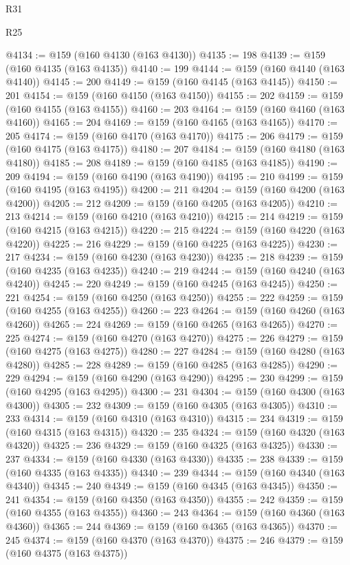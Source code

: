\begin{lexlean}{R31}
\begin{lexlean}{R25}
\begin{coremodule}
{{{{{{{{{{{{{{{{{{{{{{{{{{{{{{{{{{{{{{{{{{{{{{{{{{{{{{{{{{{{{{{{{{{{{{{{{{{{{{{{{{{{{{{{{{{{{{{{{{{{{{{{{{{{{{{{{{{{{{{{{{{{{{{{{{{{{{{{{{{{{{{{{{{{{{{{{{{{{{{{{{{{{{{{{{{{{{{{{{{{{{{{{{{{{{{{{{{{{{{@4134 := @159 (@160 @4130 (@163 @4130))
@4135 := 198
@4139 := @159 (@160 @4135 (@163 @4135))
@4140 := 199
@4144 := @159 (@160 @4140 (@163 @4140))
@4145 := 200
@4149 := @159 (@160 @4145 (@163 @4145))
@4150 := 201
@4154 := @159 (@160 @4150 (@163 @4150))
@4155 := 202
@4159 := @159 (@160 @4155 (@163 @4155))
@4160 := 203
@4164 := @159 (@160 @4160 (@163 @4160))
@4165 := 204
@4169 := @159 (@160 @4165 (@163 @4165))
@4170 := 205
@4174 := @159 (@160 @4170 (@163 @4170))
@4175 := 206
@4179 := @159 (@160 @4175 (@163 @4175))
@4180 := 207
@4184 := @159 (@160 @4180 (@163 @4180))
@4185 := 208
@4189 := @159 (@160 @4185 (@163 @4185))
@4190 := 209
@4194 := @159 (@160 @4190 (@163 @4190))
@4195 := 210
@4199 := @159 (@160 @4195 (@163 @4195))
@4200 := 211
@4204 := @159 (@160 @4200 (@163 @4200))
@4205 := 212
@4209 := @159 (@160 @4205 (@163 @4205))
@4210 := 213
@4214 := @159 (@160 @4210 (@163 @4210))
@4215 := 214
@4219 := @159 (@160 @4215 (@163 @4215))
@4220 := 215
@4224 := @159 (@160 @4220 (@163 @4220))
@4225 := 216
@4229 := @159 (@160 @4225 (@163 @4225))
@4230 := 217
@4234 := @159 (@160 @4230 (@163 @4230))
@4235 := 218
@4239 := @159 (@160 @4235 (@163 @4235))
@4240 := 219
@4244 := @159 (@160 @4240 (@163 @4240))
@4245 := 220
@4249 := @159 (@160 @4245 (@163 @4245))
@4250 := 221
@4254 := @159 (@160 @4250 (@163 @4250))
@4255 := 222
@4259 := @159 (@160 @4255 (@163 @4255))
@4260 := 223
@4264 := @159 (@160 @4260 (@163 @4260))
@4265 := 224
@4269 := @159 (@160 @4265 (@163 @4265))
@4270 := 225
@4274 := @159 (@160 @4270 (@163 @4270))
@4275 := 226
@4279 := @159 (@160 @4275 (@163 @4275))
@4280 := 227
@4284 := @159 (@160 @4280 (@163 @4280))
@4285 := 228
@4289 := @159 (@160 @4285 (@163 @4285))
@4290 := 229
@4294 := @159 (@160 @4290 (@163 @4290))
@4295 := 230
@4299 := @159 (@160 @4295 (@163 @4295))
@4300 := 231
@4304 := @159 (@160 @4300 (@163 @4300))
@4305 := 232
@4309 := @159 (@160 @4305 (@163 @4305))
@4310 := 233
@4314 := @159 (@160 @4310 (@163 @4310))
@4315 := 234
@4319 := @159 (@160 @4315 (@163 @4315))
@4320 := 235
@4324 := @159 (@160 @4320 (@163 @4320))
@4325 := 236
@4329 := @159 (@160 @4325 (@163 @4325))
@4330 := 237
@4334 := @159 (@160 @4330 (@163 @4330))
@4335 := 238
@4339 := @159 (@160 @4335 (@163 @4335))
@4340 := 239
@4344 := @159 (@160 @4340 (@163 @4340))
@4345 := 240
@4349 := @159 (@160 @4345 (@163 @4345))
@4350 := 241
@4354 := @159 (@160 @4350 (@163 @4350))
@4355 := 242
@4359 := @159 (@160 @4355 (@163 @4355))
@4360 := 243
@4364 := @159 (@160 @4360 (@163 @4360))
@4365 := 244
@4369 := @159 (@160 @4365 (@163 @4365))
@4370 := 245
@4374 := @159 (@160 @4370 (@163 @4370))
@4375 := 246
@4379 := @159 (@160 @4375 (@163 @4375))
}}}}}}}}}}}}}}}}}}}}}}}}}}}}}}}}}}}}}}}}}}}}}}}}}}}}}}}}}}}}}}}}}}}}}}}}}}}}}}}}}}}}}}}}}}}}}}}}}}}}}}}}}}}}}}}}}}}}}}}}}}}}}}}}}}}}}}}}}}}}}}}}}}}}}}}}}}}}}}}}}}}}}}}}}}}}}}}}}}}}}}}}}}}}}}}}}}}}}}}
\end{coremodule}
\end{lexlean}
\end{lexlean}
